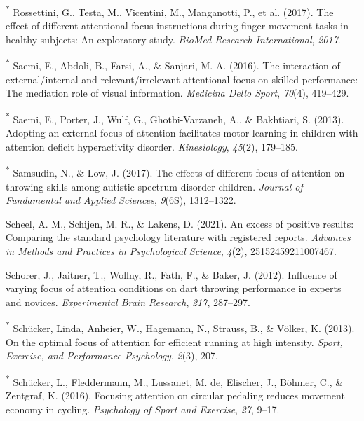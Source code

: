 \documentclass[
  man, donotrepeattitle,floatsintext]{apa7}
\newlength{\cslhangindent}
\newlength{\cslentryspacingunit} %
\newenvironment{CSLReferences}[2] %
 {%
  \setlength{\parindent}{0pt}
  \ifodd #1
  \let\oldpar\par
  \def\par{\hangindent=\cslhangindent\oldpar}
  \fi
  \setlength{\parskip}{#2\cslentryspacingunit}
 }%
 {}
\begin{document}
\begin{CSLReferences}{1}{0}
\leavevmode{}%
\textsuperscript{*} Rossettini, G., Testa, M., Vicentini, M., Manganotti, P., et al. (2017). The effect of different attentional focus instructions during finger movement tasks in healthy subjects: An exploratory study. \emph{BioMed Research International}, \emph{2017}.

\leavevmode{}%
\textsuperscript{*} Saemi, E., Abdoli, B., Farsi, A., \& Sanjari, M. A. (2016). The interaction of external/internal and relevant/irrelevant attentional focus on skilled performance: The mediation role of visual information. \emph{Medicina Dello Sport}, \emph{70}(4), 419--429.

\leavevmode{}%
\textsuperscript{*} Saemi, E., Porter, J., Wulf, G., Ghotbi-Varzaneh, A., \& Bakhtiari, S. (2013). Adopting an external focus of attention facilitates motor learning in children with attention deficit hyperactivity disorder. \emph{Kinesiology}, \emph{45}(2), 179--185.

\leavevmode{}%
\textsuperscript{*} Samsudin, N., \& Low, J. (2017). The effects of different focus of attention on throwing skills among autistic spectrum disorder children. \emph{Journal of Fundamental and Applied Sciences}, \emph{9}(6S), 1312--1322.

\leavevmode{}%
Scheel, A. M., Schijen, M. R., \& Lakens, D. (2021). An excess of positive results: Comparing the standard psychology literature with registered reports. \emph{Advances in Methods and Practices in Psychological Science}, \emph{4}(2), 25152459211007467.

\leavevmode{}%
Schorer, J., Jaitner, T., Wollny, R., Fath, F., \& Baker, J. (2012). Influence of varying focus of attention conditions on dart throwing performance in experts and novices. \emph{Experimental Brain Research}, \emph{217}, 287--297.

\leavevmode{}%
\textsuperscript{*} Schücker, Linda, Anheier, W., Hagemann, N., Strauss, B., \& Völker, K. (2013). On the optimal focus of attention for efficient running at high intensity. \emph{Sport, Exercise, and Performance Psychology}, \emph{2}(3), 207.

\leavevmode{}%
\textsuperscript{*} Schücker, L., Fleddermann, M., Lussanet, M. de, Elischer, J., Böhmer, C., \& Zentgraf, K. (2016). Focusing attention on circular pedaling reduces movement economy in cycling. \emph{Psychology of Sport and Exercise}, \emph{27}, 9--17.


\end{CSLReferences}
\end{document}
